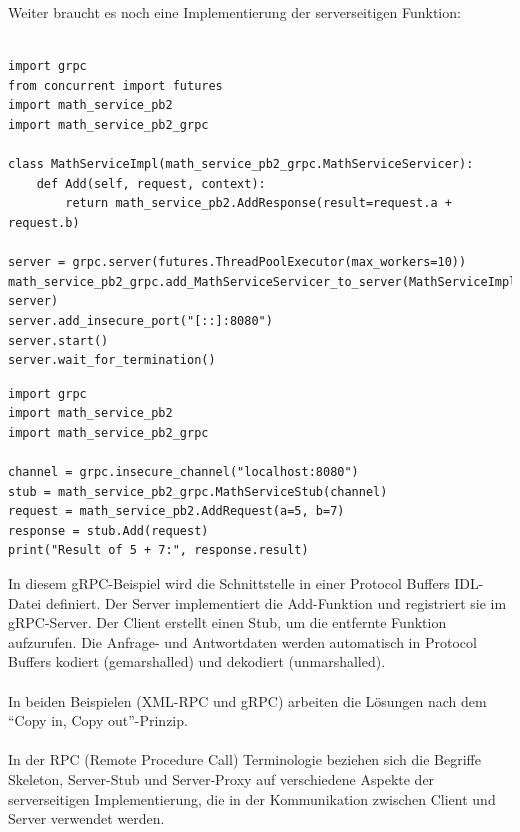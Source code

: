 \documentclass[../vs-script-first-v01.tex]{subfiles}
\begin{document}
Weiter braucht es noch eine Implementierung der serverseitigen Funktion:\\\\

\noindent\begin{minipage}{\textwidth}
\begin{lstlisting}[caption={gRPC Server Python},captionpos=b,label={lst:grpc-server}]
import grpc
from concurrent import futures
import math_service_pb2
import math_service_pb2_grpc

class MathServiceImpl(math_service_pb2_grpc.MathServiceServicer):
    def Add(self, request, context):
        return math_service_pb2.AddResponse(result=request.a + request.b)

server = grpc.server(futures.ThreadPoolExecutor(max_workers=10))
math_service_pb2_grpc.add_MathServiceServicer_to_server(MathServiceImpl(), server)
server.add_insecure_port("[::]:8080")
server.start()
server.wait_for_termination()
\end{lstlisting}
\end{minipage}

\noindent\begin{minipage}{\textwidth}
\begin{lstlisting}[caption={gRPC Client Python},captionpos=b,label={lst:grpc-client}]
import grpc
import math_service_pb2
import math_service_pb2_grpc

channel = grpc.insecure_channel("localhost:8080")
stub = math_service_pb2_grpc.MathServiceStub(channel)
request = math_service_pb2.AddRequest(a=5, b=7)
response = stub.Add(request)
print("Result of 5 + 7:", response.result)
\end{lstlisting}
\end{minipage}
In diesem gRPC-Beispiel wird die Schnittstelle in einer Protocol Buffers IDL-Datei definiert. Der Server implementiert die Add-Funktion und registriert sie im gRPC-Server. Der Client erstellt einen Stub, um die entfernte Funktion aufzurufen. Die Anfrage- und Antwortdaten werden automatisch in Protocol Buffers kodiert (gemarshalled) und dekodiert (unmarshalled).
\\\\
In beiden Beispielen (XML-RPC und gRPC) arbeiten die Lösungen nach dem \enquote{Copy in, Copy out}-Prinzip.
\\\\
In der RPC (Remote Procedure Call) Terminologie beziehen sich die Begriffe Skeleton, Server-Stub und Server-Proxy auf verschiedene Aspekte der serverseitigen Implementierung, die in der Kommunikation zwischen Client und Server verwendet werden. 
\end{document}
